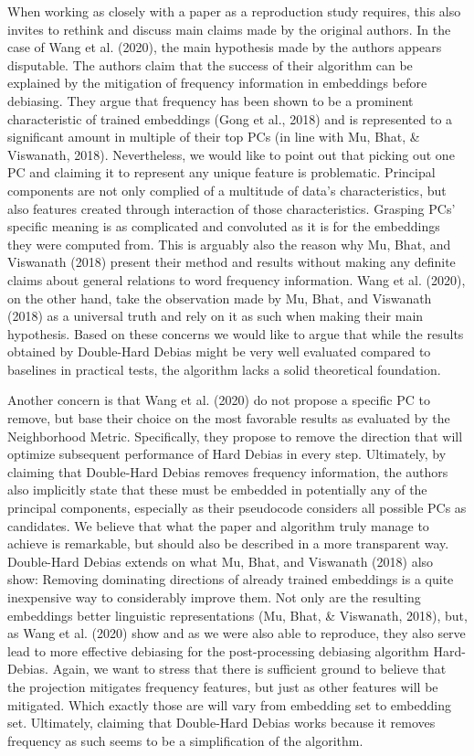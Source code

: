 \documentclass[
  english,
  man,floatsintext]{apa6}
\begin{document}
When working as closely with a paper as a reproduction study requires, this also invites to rethink and discuss main claims made by the original authors. In the case of Wang et al. (2020), the main hypothesis made by the authors appears disputable. The authors claim that the success of their algorithm can be explained by the mitigation of frequency information in embeddings before debiasing. They argue that frequency has been shown to be a prominent characteristic of trained embeddings (Gong et al., 2018) and is represented to a significant amount in multiple of their top PCs (in line with Mu, Bhat, \& Viswanath, 2018). Nevertheless, we would like to point out that picking out one PC and claiming it to represent any unique feature is problematic. Principal components are not only complied of a multitude of data's characteristics, but also features created through interaction of those characteristics. Grasping PCs' specific meaning is as complicated and convoluted as it is for the embeddings they were computed from. This is arguably also the reason why Mu, Bhat, and Viswanath (2018) present their method and results without making any definite claims about general relations to word frequency information. Wang et al. (2020), on the other hand, take the observation made by Mu, Bhat, and Viswanath (2018) as a universal truth and rely on it as such when making their main hypothesis. Based on these concerns we would like to argue that while the results obtained by Double-Hard Debias might be very well evaluated compared to baselines in practical tests, the algorithm lacks a solid theoretical foundation.

Another concern is that Wang et al. (2020) do not propose a specific PC to remove, but base their choice on the most favorable results as evaluated by the Neighborhood Metric. Specifically, they propose to remove the direction that will optimize subsequent performance of Hard Debias in every step. Ultimately, by claiming that Double-Hard Debias removes frequency information, the authors also implicitly state that these must be embedded in potentially any of the principal components, especially as their pseudocode considers all possible PCs as candidates.
We believe that what the paper and algorithm truly manage to achieve is remarkable, but should also be described in a more transparent way. Double-Hard Debias extends on what Mu, Bhat, and Viswanath (2018) also show: Removing dominating directions of already trained embeddings is a quite inexpensive way to considerably improve them. Not only are the resulting embeddings better linguistic representations (Mu, Bhat, \& Viswanath, 2018), but, as Wang et al. (2020) show and as we were also able to reproduce, they also serve lead to more effective debiasing for the post-processing debiasing algorithm Hard-Debias.
Again, we want to stress that there is sufficient ground to believe that the projection mitigates frequency features, but just as other features will be mitigated. Which exactly those are will vary from embedding set to embedding set. Ultimately, claiming that Double-Hard Debias works because it removes frequency as such seems to be a simplification of the algorithm.
\end{document}
